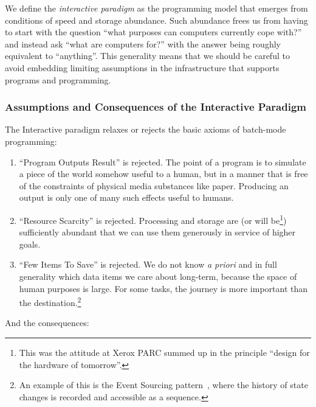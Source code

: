 \documentclass[ twoside,openright,titlepage,numbers=noenddot,headinclude,footinclude,cleardoublepage=empty,abstract=on,
                BCOR=5mm,paper=a4,fontsize=11pt
                ]{scrreprt}
\providecommand{\tightlist}{}\newenvironment{longtable}[2]{\begin{tabular}}{\end{tabular}}
\theoremstyle{definition}
\begin{document}
We define the \emph{interactive paradigm} as the programming model that
emerges from conditions of speed and storage abundance. Such abundance
frees us from having to start with the question ``what purposes can
computers currently cope with?'' and instead ask ``what are computers
for?'' with the answer being roughly equivalent to ``anything''. This
generality means that we should be careful to avoid embedding limiting
assumptions in the infrastructure that supports programs and
programming.

\hypertarget{assumptions-and-consequences-of-the-interactive-paradigm}{\subsubsection{Assumptions and Consequences of the Interactive
Paradigm}\label{assumptions-and-consequences-of-the-interactive-paradigm}}

The Interactive paradigm relaxes or rejects the basic axioms of
batch-mode programming:

\begin{enumerate}
\def\labelenumi{\arabic{enumi}.}
\tightlist
\item
  ``Program Outputs Result'' is rejected. The point of a program is to
  simulate a piece of the world somehow useful to a human, but in a
  manner that is free of the constraints of physical media substances
  like paper. Producing an output is only one of many such effects
  useful to humans.
\item
  ``Resource Scarcity'' is rejected. Processing and storage are (or will
  be\footnote{This was the attitude at Xerox PARC summed up in the
    principle ``design for the hardware of tomorrow''.}) sufficiently
  abundant that we can use them generously in service of higher goals.
\item
  ``Few Items To Save'' is rejected. We do not know \emph{a priori} and
  in full generality which data items we care about long-term, because
  the space of human purposes is large. For some tasks, the journey is
  more important than the destination.\footnote{An example of this is
    the Event Sourcing pattern~\parencite{EvSourcing}, where the history
    of state changes is recorded and accessible as a sequence.}
\end{enumerate}

And the consequences:
\end{document}
